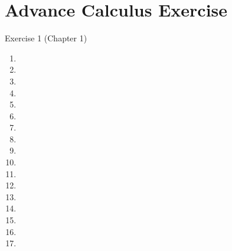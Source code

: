


\cfoot{\thepage} %

\section*{Advance Calculus Exercise}
\center Exercise 1 (Chapter 1)
 
 \begin{enumerate}[wide,label = $\arabic* .$]
 
 	\item 
 	\item 
 	\item 
 	\item 
 	\item 
 	\item 
 	\item 
 	\item 
 	\item 
 	\item 
 	\item 
 	\item 
 	\item 
 	\item 
 	\item 
 	\item 
 	\item 
   
 \end{enumerate}

